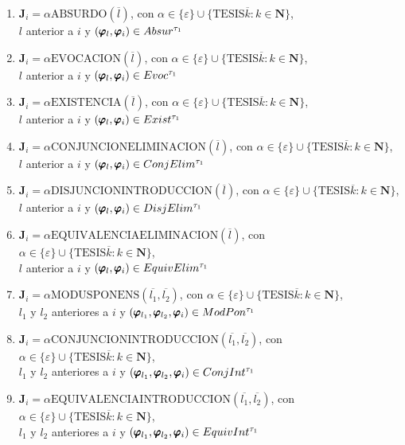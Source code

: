 \begin{definition}
\begin{enumerate}
\begin{enumerate}
      \item $\mathbf{J}_i=\alpha\text{ABSURDO}(\overline{l})$, con $\alpha\in\{\varepsilon\}\cup\{\text{TESIS}\overline{k}:k\in\mathbf{N}\}$, \\$l$ anterior a $i$ y $(\pmb{\varphi}_l,\pmb{\varphi}_i)\in Absur^{\tau_1}$
      \item $\mathbf{J}_i=\alpha\text{EVOCACION}(\overline{l})$, con $\alpha\in\{\varepsilon\}\cup\{\text{TESIS}\overline{k}:k\in\mathbf{N}\}$, \\$l$ anterior a $i$ y $(\pmb{\varphi}_l,\pmb{\varphi}_i)\in Evoc^{\tau_1}$
      \item $\mathbf{J}_i=\alpha\text{EXISTENCIA}(\overline{l})$, con $\alpha\in\{\varepsilon\}\cup\{\text{TESIS}\overline{k}:k\in\mathbf{N}\}$, \\$l$ anterior a $i$ y $(\pmb{\varphi}_l,\pmb{\varphi}_i)\in Exist^{\tau_1}$
      \item $\mathbf{J}_i=\alpha\text{CONJUNCIONELIMINACION}(\overline{l})$, con $\alpha\in\{\varepsilon\}\cup\{\text{TESIS}\overline{k}:k\in\mathbf{N}\}$, \\$l$ anterior a $i$ y $(\pmb{\varphi}_l,\pmb{\varphi}_i)\in ConjElim^{\tau_1}$
      \item $\mathbf{J}_i=\alpha\text{DISJUNCIONINTRODUCCION}(\overline{l})$, con $\alpha\in\{\varepsilon\}\cup\{\text{TESIS}\overline{k}:k\in\mathbf{N}\}$, \\$l$ anterior a $i$ y $(\pmb{\varphi}_l,\pmb{\varphi}_i)\in DisjElim^{\tau_1}$
      \item $\mathbf{J}_i=\alpha\text{EQUIVALENCIAELIMINACION}(\overline{l})$, con $\alpha\in\{\varepsilon\}\cup\{\text{TESIS}\overline{k}:k\in\mathbf{N}\}$, \\$l$ anterior a $i$ y $(\pmb{\varphi}_l,\pmb{\varphi}_i)\in EquivElim^{\tau_1}$
      \item $\mathbf{J}_i=\alpha\text{MODUSPONENS}(\overline{l_1},\overline{l_2})$, con $\alpha\in\{\varepsilon\}\cup\{\text{TESIS}\overline{k}:k\in\mathbf{N}\}$, \\$l_1$ y $l_2$ anteriores a $i$ y $(\pmb{\varphi}_{l_1},\pmb{\varphi}_{l_2},\pmb{\varphi}_i)\in ModPon^{\tau_1}$
      \item $\mathbf{J}_i=\alpha\text{CONJUNCIONINTRODUCCION}(\overline{l_1},\overline{l_2})$, con $\alpha\in\{\varepsilon\}\cup\{\text{TESIS}\overline{k}:k\in\mathbf{N}\}$, \\$l_1$ y $l_2$ anteriores a $i$ y $(\pmb{\varphi}_{l_1},\pmb{\varphi}_{l_2},\pmb{\varphi}_i)\in ConjInt^{\tau_1}$
      \item $\mathbf{J}_i=\alpha\text{EQUIVALENCIAINTRODUCCION}(\overline{l_1},\overline{l_2})$, con $\alpha\in\{\varepsilon\}\cup\{\text{TESIS}\overline{k}:k\in\mathbf{N}\}$, \\$l_1$ y $l_2$ anteriores a $i$ y $(\pmb{\varphi}_{l_1},\pmb{\varphi}_{l_2},\pmb{\varphi}_i)\in EquivInt^{\tau_1}$    

\end{enumerate}
\end{enumerate}
\end{definition}
